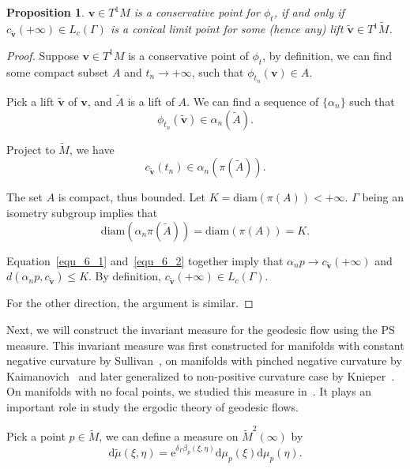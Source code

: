 \documentclass[reqno,11pt]{article}
\newtheorem{proposition}[theorem]{Proposition}
\theoremstyle{definition}
\theoremstyle{remark}
\numberwithin{equation}{section}
\begin{document}
\begin{proposition}\label{prop_6_2}
	$\bm{v}\in T^1M$ is a conservative point for $\phi_t$, if and only if $c_{\bm{\widetilde{v}}}(+\infty)\in L_c(\Gamma)$ is a conical limit point for some (hence any) lift $\bm{\widetilde{v}}\in T^1\widetilde{M}$.
\end{proposition}

\begin{proof}
	Suppose $\bm{v}\in T^1M$ is a conservative point of $\phi_t$, by definition, we can find some compact subset $A$ and $t_n\to+\infty$, such that $\phi_{t_n}(\bm{v})\in A$.

	Pick a lift $\bm{\widetilde{v}}$ of $\bm{v}$, and $\widetilde{A}$ is a lift of $A$. We can find a sequence of $\{\alpha_n\}$ such that
	\begin{displaymath}
		\phi_{t_n}(\bm{\widetilde{v}})\in\alpha_n(\widetilde{A}).
	\end{displaymath}

	Project to $\widetilde{M}$, we have
	\begin{equation}\label{equ_6_1}
		c_{\bm{\widetilde{v}}}(t_n)\in\alpha_n(\pi(\widetilde{A})).
	\end{equation}

	The set $A$ is compact, thus bounded. Let $K=\text{diam}(\pi(A))<+\infty$. $\Gamma$ being an isometry subgroup implies that
	\begin{equation}\label{equ_6_2}
		\text{diam}(\alpha_n\pi(\widetilde{A}))=\text{diam}(\pi(A))=K.
	\end{equation}

	Equation~\ref{equ_6_1} and~\ref{equ_6_2} together imply that $\alpha_n p\to c_{\bm{\widetilde{v}}}(+\infty)$ and $d(\alpha_n p, c_{\bm{\widetilde{v}}})\leq K$. By definition, $c_{\bm{\widetilde{v}}}(+\infty)\in L_c(\Gamma)$.

	For the other direction, the argument is similar.
\end{proof}

Next, we will construct the invariant measure for the geodesic flow using the PS measure. This invariant measure was first constructed for manifolds with constant negative curvature by Sullivan~\cite{Su}, on manifolds with pinched negative curvature by Kaimanovich~\cite{Ka1} and later generalized to non-positive curvature case by Knieper~\cite{Kn1}. On manifolds with no focal points, we studied this measure in~\cite{LWW}. It plays an important role in study the ergodic theory of geodesic flows.

Pick a point $p\in\widetilde{M}$, we can define a measure on $\widetilde{M}^2(\infty)$ by
\begin{displaymath}
	\mathrm{d}\widetilde{\mu}(\xi,\eta)=\mathrm{e}^{\delta_\Gamma\beta_p(\xi,\eta)}\mathrm{d}\mu_p(\xi)\mathrm{d}\mu_p(\eta).
\end{displaymath}
\end{document}
